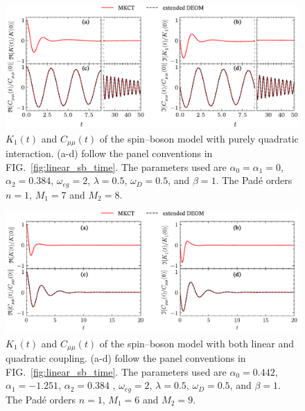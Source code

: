 \documentclass[preprint,aip,jcp]{revtex4-2}
\begin{document}
\begin{figure}[htbp]
    \centering
    \includegraphics[width=0.99\linewidth]{figs/quad-time.pdf}
    \caption{$K_1(t)$ and $C_{\mu\mu}(t)$ of the spin–boson model with purely quadratic interaction. (a-d) follow the panel conventions in FIG.~\ref{fig:linear_sb_time}. The parameters used are  $\alpha_0=\alpha_1=0$, $\alpha_2=0.384$, $\omega_{eg}= 2$, $\lambda=0.5$, $\omega_D=0.5$, and $\beta = 1$. The Pad\'{e} orders $n=1$, $M_1=7$ and $M_2=8$.}
    \label{fig:quad_sb_time}
\end{figure}

\begin{figure}[htbp]
    \centering
    \includegraphics[width=0.99\linewidth]{figs/quad_linear-time.pdf}
    \caption{$K_1(t)$ and $C_{\mu\mu}(t)$ of the spin–boson model with both linear and quadratic coupling. (a-d) follow the panel conventions in FIG.~\ref{fig:linear_sb_time}. The parameters used are  $\alpha_0=0.442$, $\alpha_1=-1.251$, $\alpha_2 = 0.384$ , $\omega_{eg}= 2$, $\lambda=0.5$, $\omega_D=0.5$, and $\beta = 1$. The Pad\'{e} orders $n=1$, $M_1=6$ and $M_2=9$.}
    \label{fig:quad_linear_sb_time}
\end{figure}
\end{document}

